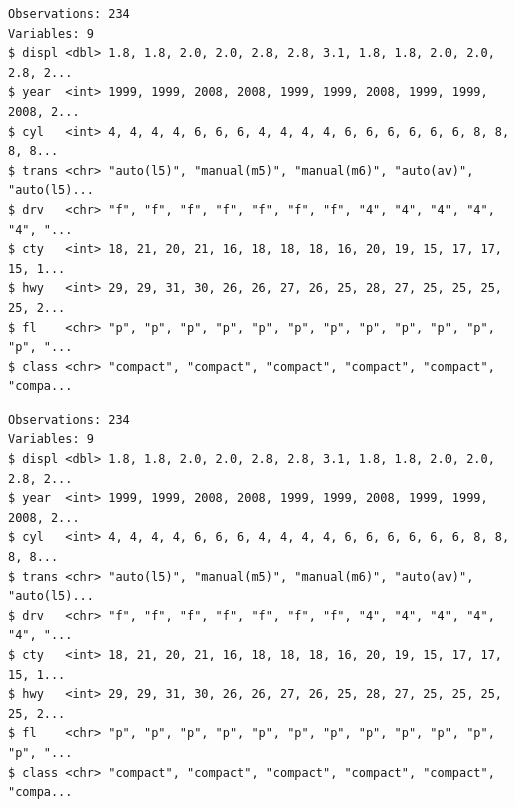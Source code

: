 \documentclass[
  11pt,
]{krantz}
\newenvironment{Shaded}{\begin{snugshade}}{\end{snugshade}}
\newcommand{\CommentTok}[1]{\textcolor[rgb]{0.37,0.37,0.37}{\textit{#1}}}
\newcommand{\KeywordTok}[1]{\textcolor[rgb]{0.27,0.27,0.27}{\textbf{#1}}}
\newcommand{\NormalTok}[1]{#1}
\newcommand{\OperatorTok}[1]{\textcolor[rgb]{0.43,0.43,0.43}{\textbf{#1}}}
\newcommand{\StringTok}[1]{\textcolor[rgb]{0.5,0.5,0.5}{#1}}
\begin{document}
\footnotesize

\begin{Shaded}
\end{Shaded}

\begin{verbatim}
Observations: 234
Variables: 9
$ displ <dbl> 1.8, 1.8, 2.0, 2.0, 2.8, 2.8, 3.1, 1.8, 1.8, 2.0, 2.0, 2.8, 2...
$ year  <int> 1999, 1999, 2008, 2008, 1999, 1999, 2008, 1999, 1999, 2008, 2...
$ cyl   <int> 4, 4, 4, 4, 6, 6, 6, 4, 4, 4, 4, 6, 6, 6, 6, 6, 6, 8, 8, 8, 8...
$ trans <chr> "auto(l5)", "manual(m5)", "manual(m6)", "auto(av)", "auto(l5)...
$ drv   <chr> "f", "f", "f", "f", "f", "f", "f", "4", "4", "4", "4", "4", "...
$ cty   <int> 18, 21, 20, 21, 16, 18, 18, 18, 16, 20, 19, 15, 17, 17, 15, 1...
$ hwy   <int> 29, 29, 31, 30, 26, 26, 27, 26, 25, 28, 27, 25, 25, 25, 25, 2...
$ fl    <chr> "p", "p", "p", "p", "p", "p", "p", "p", "p", "p", "p", "p", "...
$ class <chr> "compact", "compact", "compact", "compact", "compact", "compa...
\end{verbatim}

\begin{Shaded}
\end{Shaded}

\begin{verbatim}
Observations: 234
Variables: 9
$ displ <dbl> 1.8, 1.8, 2.0, 2.0, 2.8, 2.8, 3.1, 1.8, 1.8, 2.0, 2.0, 2.8, 2...
$ year  <int> 1999, 1999, 2008, 2008, 1999, 1999, 2008, 1999, 1999, 2008, 2...
$ cyl   <int> 4, 4, 4, 4, 6, 6, 6, 4, 4, 4, 4, 6, 6, 6, 6, 6, 6, 8, 8, 8, 8...
$ trans <chr> "auto(l5)", "manual(m5)", "manual(m6)", "auto(av)", "auto(l5)...
$ drv   <chr> "f", "f", "f", "f", "f", "f", "f", "4", "4", "4", "4", "4", "...
$ cty   <int> 18, 21, 20, 21, 16, 18, 18, 18, 16, 20, 19, 15, 17, 17, 15, 1...
$ hwy   <int> 29, 29, 31, 30, 26, 26, 27, 26, 25, 28, 27, 25, 25, 25, 25, 2...
$ fl    <chr> "p", "p", "p", "p", "p", "p", "p", "p", "p", "p", "p", "p", "...
$ class <chr> "compact", "compact", "compact", "compact", "compact", "compa...
\end{verbatim}
\end{document}
